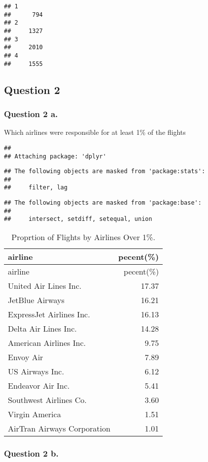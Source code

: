 \documentclass[]{article}
\begin{document}
\begin{verbatim}
## 1
##      794
## 2
##     1327
## 3
##     2010
## 4
##     1555
\end{verbatim}

\pagebreak

\subsection{Question 2}\label{question-2}

\subsubsection{Question 2 a.}\label{question-2-a.}

Which airlines were responsible for at least 1\% of the flights

\begin{verbatim}
## 
## Attaching package: 'dplyr'
\end{verbatim}

\begin{verbatim}
## The following objects are masked from 'package:stats':
## 
##     filter, lag
\end{verbatim}

\begin{verbatim}
## The following objects are masked from 'package:base':
## 
##     intersect, setdiff, setequal, union
\end{verbatim}

\begin{longtable}[]{@{}lr@{}}
\caption{Proprtion of Flights by Airlines Over 1\%.}\tabularnewline
\toprule
airline & pecent(\%)\tabularnewline
\midrule
\endfirsthead
\toprule
airline & pecent(\%)\tabularnewline
\midrule
\endhead
United Air Lines Inc. & 17.37\tabularnewline
JetBlue Airways & 16.21\tabularnewline
ExpressJet Airlines Inc. & 16.13\tabularnewline
Delta Air Lines Inc. & 14.28\tabularnewline
American Airlines Inc. & 9.75\tabularnewline
Envoy Air & 7.89\tabularnewline
US Airways Inc. & 6.12\tabularnewline
Endeavor Air Inc. & 5.41\tabularnewline
Southwest Airlines Co. & 3.60\tabularnewline
Virgin America & 1.51\tabularnewline
AirTran Airways Corporation & 1.01\tabularnewline
\bottomrule
\end{longtable}

\subsubsection{Question 2 b.}\label{question-2-b.}
\end{document}
